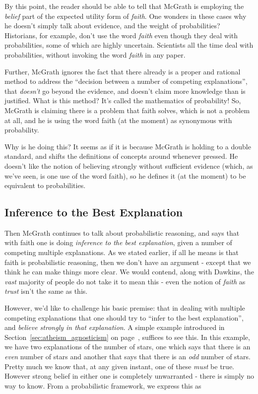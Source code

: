 By this point, the reader should be able to tell that McGrath is employing the {\em belief} part of the expected utility form of {\em faith}.  One wonders in these cases why he doesn't simply talk about evidence, and the weight of
probabilities? Historians, for example, don't use the word \emph{faith}
even though they deal with probabilities, some of which are highly
uncertain. Scientists all the time deal with probabilities, without
invoking the word \emph{faith} in any paper.

Further, McGrath ignores the fact that there already is a proper and
rational method to address the ``decision between a number of competing
explanations'', that \emph{doesn't} go beyond the evidence, and doesn't
claim more knowledge than is justified. What is this method? It's called
the mathematics of probability! So, McGrath is claiming there is a
problem that faith solves, which is not a problem at all, and he is
using the word faith (at the moment) as synonymous with probability.

Why is he doing this? It seems as if it is because McGrath is holding to
a double standard, and shifts the definitions of concepts around
whenever pressed. He doesn't like the notion of believing strongly
without sufficient evidence (which, as we've seen, is one use of the word faith), so he
defines it (at the moment) to be equivalent to probabilities.

\subsection{Inference to the Best Explanation}

Then McGrath continues to talk about probabilistic reasoning,
and says that with faith one is doing \emph{inference to the best
explanation}, given a number of competing multiple explanations. As we
stated earlier, if all he means is that faith is probabilistic
reasoning, then we don't have an argument - except that we think he can make things more clear. We would contend, along with Dawkins, the \emph{vast} majority of people do not take it to mean this - even the notion of {\em faith} as {\em trust} isn't the same as this.

However, we'd like to challenge his basic premise: that in
dealing with multiple competing explanations that one should try to
``infer to the best explanation'', and \emph{believe strongly in that
explanation}. A simple example introduced in Section~\ref{sec:atheism_agnosticism} on page~\pageref{sec:atheism_agnosticism}, suffices to see this. In this example, we have two explanations of the number of stars, one which
says that there is an \emph{even} number of stars and another that says
that there is an \emph{odd} number of stars. Pretty much we know that,
at any given instant, one of these \emph{must} be true. However strong
belief in either one is completely unwarranted - there is simply no way
to know. From a probabilistic framework, we express this as

